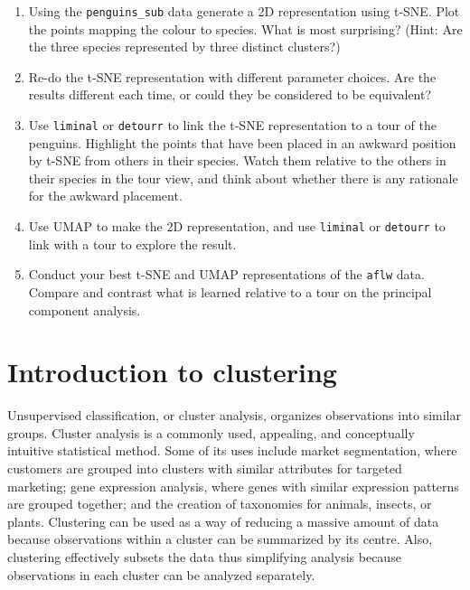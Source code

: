 \documentclass[
  letterpaper,
]{krantz}
\providecommand{\tightlist}{%
  \setlength{\itemsep}{0pt}\setlength{\parskip}{0pt}}\usepackage{longtable,booktabs,array}
\begin{document}

\begin{enumerate}
\def\labelenumi{\arabic{enumi}.}
\tightlist
\item
  Using the \texttt{penguins\_sub} data generate a 2D representation
  using t-SNE. Plot the points mapping the colour to species. What is
  most surprising? (Hint: Are the three species represented by three
  distinct clusters?)
\item
  Re-do the t-SNE representation with different parameter choices. Are
  the results different each time, or could they be considered to be
  equivalent?
\item
  Use \texttt{liminal} or \texttt{detourr} to link the t-SNE
  representation to a tour of the penguins. Highlight the points that
  have been placed in an awkward position by t-SNE from others in their
  species. Watch them relative to the others in their species in the
  tour view, and think about whether there is any rationale for the
  awkward placement.
\item
  Use UMAP to make the 2D representation, and use \texttt{liminal} or
  \texttt{detourr} to link with a tour to explore the result.
\item
  Conduct your best t-SNE and UMAP representations of the \texttt{aflw}
  data. Compare and contrast what is learned relative to a tour on the
  principal component analysis.
\end{enumerate}


\chapter{Introduction to clustering}\label{introduction-to-clustering}

Unsupervised classification, or cluster analysis, organizes observations
into similar groups. Cluster analysis is a commonly used, appealing, and
conceptually intuitive statistical method. Some of its uses include
market segmentation, where customers are grouped into clusters with
similar attributes for targeted marketing; gene expression analysis,
where genes with similar expression patterns are grouped together; and
the creation of taxonomies for animals, insects, or plants. Clustering
can be used as a way of reducing a massive amount of data because
observations within a cluster can be summarized by its centre. Also,
clustering effectively subsets the data thus simplifying analysis
because observations in each cluster can be analyzed separately.
\end{document}
